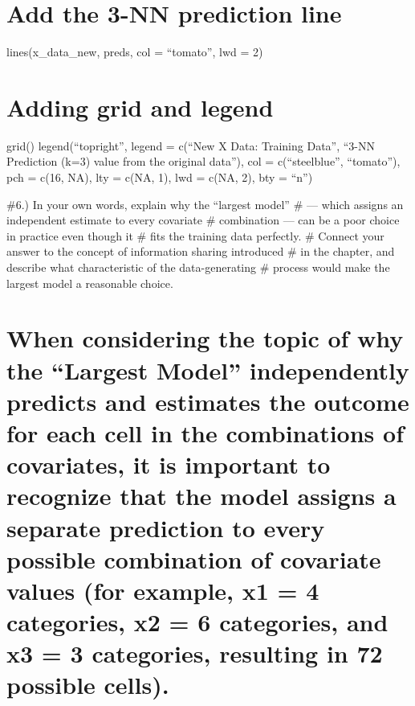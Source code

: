 \documentclass[
  letterpaper,
  DIV=11,
  numbers=noendperiod]{scrreprt}
\begin{document}
{\chapter{Add the 3-NN prediction
line}\label{add-the-3-nn-prediction-line}

lines(x\_data\_new, preds, col = ``tomato'', lwd = 2)


\chapter{Adding grid and legend}\label{adding-grid-and-legend}

grid() legend(``topright'', legend = c(``New X Data: Training Data'',
``3-NN Prediction (k=3) value from the original data''), col =
c(``steelblue'', ``tomato''), pch = c(16, NA), lty = c(NA, 1), lwd =
c(NA, 2), bty = ``n'')

\#6.) In your own words, explain why the ``largest model'' \# --- which
assigns an independent estimate to every covariate \# combination ---
can be a poor choice in practice even though it \# fits the training
data perfectly. \# Connect your answer to the concept of information
sharing introduced \# in the chapter, and describe what characteristic
of the data-generating \# process would make the largest model a
reasonable choice.


\chapter{When considering the topic of why the ``Largest Model''
independently predicts and estimates the outcome for each cell in the
combinations of covariates, it is important to recognize that the model
assigns a separate prediction to every possible combination of covariate
values (for example, x1 = 4 categories, x2 = 6 categories, and x3 = 3
categories, resulting in 72 possible
cells).}\label{when-considering-the-topic-of-why-the-largest-model-independently-predicts-and-estimates-the-outcome-for-each-cell-in-the-combinations-of-covariates-it-is-important-to-recognize-that-the-model-assigns-a-separate-prediction-to-every-possible-combination-of-covariate-values-for-example-x1-4-categories-x2-6-categories-and-x3-3-categories-resulting-in-72-possible-cells.}


}
\end{document}
